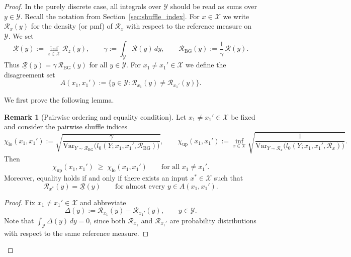 \documentclass{article}
\theoremstyle{plain}
\theoremstyle{definition}
\newtheorem{lemma}[theorem]{Remark}
\begin{document}
\begin{proof}

In the purely discrete case, all integrals over $\mathcal Y$ should be
read as sums over $y\in\mathcal Y$.
Recall the notation from Section~\ref{sec:shuffle_index}.
For $x\in\mathcal X$ we write $\mathcal R_x(y)$ for the density (or pmf)
of $\mathcal R_x$ with respect to the reference measure on $\mathcal Y$.
We set
\[
  \underline{\mathcal R}(y)
  := \inf_{z\in\mathcal X} \mathcal R_z(y),\qquad
  \gamma := \int_{\mathcal Y} \underline{\mathcal R}(y)\,dy,
  \qquad
  \mathcal R_{\mathrm{BG}}(y)
  := \frac{1}{\gamma}\,\underline{\mathcal R}(y).
\]
Thus $\underline{\mathcal R}(y) = \gamma\,\mathcal R_{\mathrm{BG}}(y)$
for all $y\in\mathcal Y$.
For $x_1\neq x_1'\in\mathcal X$ we define the disagreement set
\[
  A(x_1,x_1')
  := \bigl\{ y\in\mathcal Y : \mathcal R_{x_1}(y)\neq \mathcal R_{x_1'}(y)\bigr\}.
\]

We first prove the following lemma.

\begin{lemma}[Pairwise ordering and equality condition]
\label{lem:pairwise-chi-structure}
Let $x_1\neq x_1'\in\mathcal X$ be fixed and consider the pairwise
shuffle indices
\[
  \chi_{\mathrm{lo}}(x_1,x_1')
  := \sqrt{
        \frac{\gamma}{
          \mathrm{Var}_{Y\sim\mathcal R_{\mathrm{BG}}}
          \bigl(l_0(Y;x_1,x_1',\mathcal R_{\mathrm{BG}})\bigr)
        }
      },
  \qquad
  \chi_{\mathrm{up}}(x_1,x_1')
  := \inf_{x\in\mathcal X}
      \sqrt{
        \frac{1}{
          \mathrm{Var}_{Y\sim\mathcal R_x}
          \bigl(l_0(Y;x_1,x_1',\mathcal R_x)\bigr)
        }
      }.
\]
Then
\[
  \chi_{\mathrm{up}}(x_1,x_1')
  \;\ge\;
  \chi_{\mathrm{lo}}(x_1,x_1')
  \qquad\text{for all }x_1\neq x_1'.
\]
Moreover, equality holds if and only if there exists an input
$x^\ast\in\mathcal X$ such that
\[
  \mathcal R_{x^\ast}(y)
  = \underline{\mathcal R}(y)
  \qquad\text{for almost every }y\in A(x_1,x_1').
\]
\end{lemma}

\begin{proof}
Fix $x_1\neq x_1'\in\mathcal X$ and abbreviate
\[
  \Delta(y)
  := \mathcal R_{x_1}(y) - \mathcal R_{x_1'}(y),
  \qquad y\in\mathcal Y.
\]
Note that $\int_{\mathcal Y}\Delta(y)\,dy=0$, since both
$\mathcal R_{x_1}$ and $\mathcal R_{x_1'}$ are probability distributions
with respect to the same reference measure.


\end{proof}
\end{proof}
\end{document}
